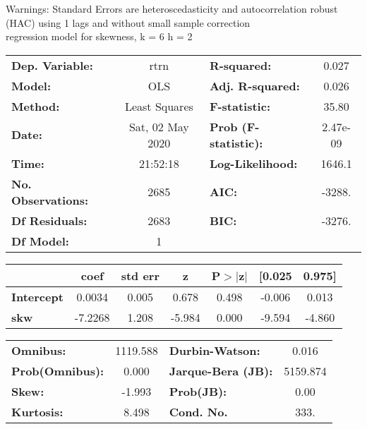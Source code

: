Warnings: \newline
 [1] Standard Errors are heteroscedasticity and autocorrelation robust (HAC) using 1 lags and without small sample correction\\ 

regression model for skewness, k = 6 h = 2\begin{center}
\begin{tabular}{lclc}
\toprule
\textbf{Dep. Variable:}    &       rtrn       & \textbf{  R-squared:         } &     0.027   \\
\textbf{Model:}            &       OLS        & \textbf{  Adj. R-squared:    } &     0.026   \\
\textbf{Method:}           &  Least Squares   & \textbf{  F-statistic:       } &     35.80   \\
\textbf{Date:}             & Sat, 02 May 2020 & \textbf{  Prob (F-statistic):} &  2.47e-09   \\
\textbf{Time:}             &     21:52:18     & \textbf{  Log-Likelihood:    } &    1646.1   \\
\textbf{No. Observations:} &        2685      & \textbf{  AIC:               } &    -3288.   \\
\textbf{Df Residuals:}     &        2683      & \textbf{  BIC:               } &    -3276.   \\
\textbf{Df Model:}         &           1      & \textbf{                     } &             \\
\bottomrule
\end{tabular}
\begin{tabular}{lcccccc}
                   & \textbf{coef} & \textbf{std err} & \textbf{z} & \textbf{P$> |$z$|$} & \textbf{[0.025} & \textbf{0.975]}  \\
\midrule
\textbf{Intercept} &       0.0034  &        0.005     &     0.678  &         0.498        &       -0.006    &        0.013     \\
\textbf{skw}       &      -7.2268  &        1.208     &    -5.984  &         0.000        &       -9.594    &       -4.860     \\
\bottomrule
\end{tabular}
\begin{tabular}{lclc}
\textbf{Omnibus:}       & 1119.588 & \textbf{  Durbin-Watson:     } &    0.016  \\
\textbf{Prob(Omnibus):} &   0.000  & \textbf{  Jarque-Bera (JB):  } & 5159.874  \\
\textbf{Skew:}          &  -1.993  & \textbf{  Prob(JB):          } &     0.00  \\
\textbf{Kurtosis:}      &   8.498  & \textbf{  Cond. No.          } &     333.  \\
\bottomrule
\end{tabular}
\end{center}

